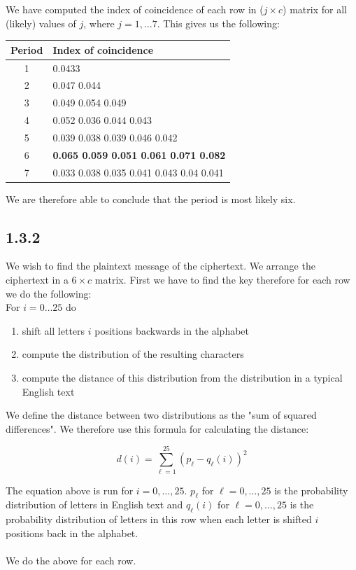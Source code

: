 \documentclass[11pt]{report}
\begin{document}
We have computed the index of coincidence of each row in ($j \times c$) matrix for all (likely) values of $j$, where $j = 1, \dots 7$. This gives us the following:
\begin{center}
\begin{tabular}{| c l |}
\hline
Period & Index of coincidence\\ \hline
1 & 0.0433\\
2 & 0.047 0.044\\
3 & 0.049 0.054 0.049\\
4 & 0.052 0.036 0.044 0.043\\
5 & 0.039 0.038 0.039 0.046 0.042\\
6 & \textbf{0.065 0.059 0.051 0.061 0.071 0.082}\\
7 & 0.033 0.038 0.035 0.041 0.043 0.04 0.041\\
\hline
\end{tabular}
\end{center}

We are therefore able to conclude that the period is most likely six.

\subsection*{1.3.2}
We wish to find the plaintext message of the ciphertext. We arrange the ciphertext in a $6 \times c$ matrix. First we have to find the key therefore for each row we do the following:\\
For $i = 0 \ldots 25$ do
\begin{enumerate}
\item shift all letters $i$ positions backwards in the alphabet
\item compute the distribution of the resulting characters
\item compute the distance of this distribution from the distribution in a typical English text
\end{enumerate}

We define the distance between two distributions as the "sum of squared differences". We therefore use this formula for calculating the distance:

$$d(i) = \sum_{\ell=1}^{25} (p_{\ell} - q_{\ell}(i))^2$$

The equation above is run for $i = 0,\ldots,25$. $p_{\ell}$ for $\ell = 0,\dots,25$ is the probability distribution of letters in English text and $q_{\ell}(i)$ for $\ell = 0,\dots,25$ is the probability distribution of letters in this row when each letter is shifted $i$ positions back in the alphabet.\\
\\
We do the above for each row.
\end{document}
